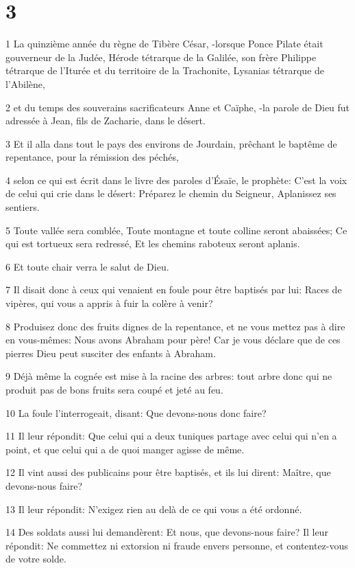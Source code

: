 \chapter{3}

\par 1 La quinzième année du règne de Tibère César, -lorsque Ponce Pilate était gouverneur de la Judée, Hérode tétrarque de la Galilée, son frère Philippe tétrarque de l'Iturée et du territoire de la Trachonite, Lysanias tétrarque de l'Abilène,
\par 2 et du temps des souverains sacrificateurs Anne et Caïphe, -la parole de Dieu fut adressée à Jean, fils de Zacharie, dans le désert.
\par 3 Et il alla dans tout le pays des environs de Jourdain, prêchant le baptême de repentance, pour la rémission des péchés,
\par 4 selon ce qui est écrit dans le livre des paroles d'Ésaïe, le prophète: C'est la voix de celui qui crie dans le désert: Préparez le chemin du Seigneur, Aplanissez ses sentiers.
\par 5 Toute vallée sera comblée, Toute montagne et toute colline seront abaissées; Ce qui est tortueux sera redressé, Et les chemins raboteux seront aplanis.
\par 6 Et toute chair verra le salut de Dieu.
\par 7 Il disait donc à ceux qui venaient en foule pour être baptisés par lui: Races de vipères, qui vous a appris à fuir la colère à venir?
\par 8 Produisez donc des fruits dignes de la repentance, et ne vous mettez pas à dire en vous-mêmes: Nous avons Abraham pour père! Car je vous déclare que de ces pierres Dieu peut susciter des enfants à Abraham.
\par 9 Déjà même la cognée est mise à la racine des arbres: tout arbre donc qui ne produit pas de bons fruits sera coupé et jeté au feu.
\par 10 La foule l'interrogeait, disant: Que devons-nous donc faire?
\par 11 Il leur répondit: Que celui qui a deux tuniques partage avec celui qui n'en a point, et que celui qui a de quoi manger agisse de même.
\par 12 Il vint aussi des publicains pour être baptisés, et ils lui dirent: Maître, que devons-nous faire?
\par 13 Il leur répondit: N'exigez rien au delà de ce qui vous a été ordonné.
\par 14 Des soldats aussi lui demandèrent: Et nous, que devons-nous faire? Il leur répondit: Ne commettez ni extorsion ni fraude envers personne, et contentez-vous de votre solde.
